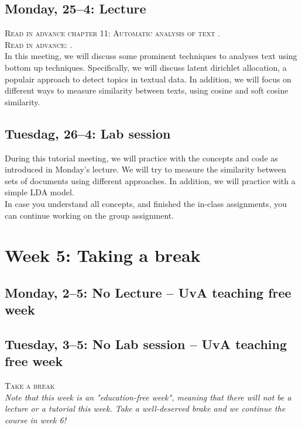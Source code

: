 \subsection*{Monday, 25--4: Lecture}
\textsc{Read in advance chapter 11: Automatic analysis of text \cite{van_atteveldt_computational_2022}.} \\
\textsc{Read in advance: \cite{Brinberg2021}.} \\

In this meeting, we will discuss some prominent techniques to analyses text using bottom up techniques. Specifically, we will discuss latent dirichlet allocation, a populair approach to detect topics in textual data. In addition, we will focus on different ways to measure similarity between texts, using cosine and soft cosine similarity. 

\subsection*{Tuesdag, 26--4: Lab session}
During this tutorial meeting, we will practice with the concepts and code as introduced in Monday's lecture. We will try to measure the similarity between sets of documents using different approaches. In addition, we will practice with a simple LDA model. \\
In case you understand all concepts, and finished the in-class assignments, you can continue working on the group assignment. 

\section*{Week 5: Taking a break}

\subsection*{Monday, 2--5: No Lecture -- UvA teaching free week}

\subsection*{Tuesday, 3--5: No Lab session -- UvA teaching free week}

\textsc{ Take a break}\\

\emph{Note that this week is an "education-free week", meaning that there will not be a lecture or a tutorial this week. Take a well-deserved brake and we continue the course in week 6!}

